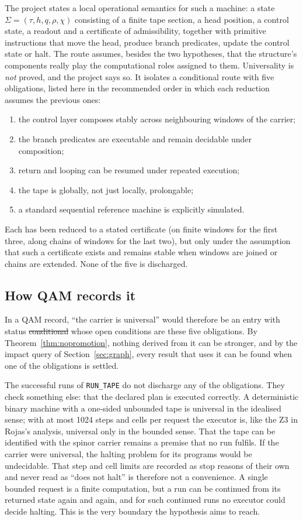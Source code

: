 The project states a local operational semantics for such a machine: a state $\Sigma=(\tau,h,q,\rho,\chi)$ consisting of a finite tape
section, a head position, a control state, a readout and a certificate of admissibility, together with primitive instructions that move
the head, produce branch predicates, update the control state or halt. The route assumes, besides the two hypotheses, that the structure's components
really play the computational roles assigned to them. Universality is \emph{not} proved, and the project says so. It isolates a
conditional route with five obligations, listed here in the recommended order in which each reduction assumes the previous ones:
\begin{enumerate}[label=\arabic*.,nosep,leftmargin=2em]
\item the control layer composes stably across neighbouring windows of the carrier;
\item the branch predicates are executable and remain decidable under composition;
\item return and looping can be resumed under repeated execution;
\item the tape is globally, not just locally, prolongable;
\item a standard sequential reference machine is explicitly simulated.
\end{enumerate}
Each has been reduced to a stated certificate (on finite windows for the first three, along chains of windows for the last two), but
only under the assumption that such a certificate exists and remains stable when windows are joined or chains are extended. None of the five is discharged.

\subsection{How QAM records it}

In a QAM record, ``the carrier is universal'' would therefore be an entry with status \st{conditional} whose open conditions are these five
obligations. By Theorem~\ref{thm:nopromotion}, nothing derived from it can be stronger, and by the impact query of
Section~\ref{sec:graph}, every result that uses it can be found when one of the obligations is settled.

The successful runs of \texttt{RUN\_TAPE} do not discharge any of the obligations. They check something else: that the declared plan is
executed correctly. A deterministic binary machine with a one-sided unbounded tape is universal in the idealised sense; with at most 1024
steps and cells per request the executor is, like the Z3 in Rojas's analysis, universal only in the bounded sense. That the tape can be
identified with the spinor carrier remains a premise that no run fulfils. If the carrier were universal, the halting problem for its
programs would be undecidable. That step and cell limits are recorded as stop reasons of their own and never read as ``does not halt'' is
therefore not a convenience. A single bounded request is a finite computation, but a run can be continued from its returned state
again and again, and for such continued runs no executor could decide halting. This is the very boundary the hypothesis aims to reach.
